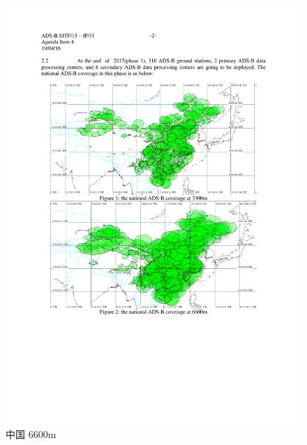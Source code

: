 \begin{figure}[htbp]
\centering
\includegraphics[width=12cm]{pic/china_6600m.pdf}
\caption{中国 6600m }
\label{fig:china_6600m}
\end{figure}

